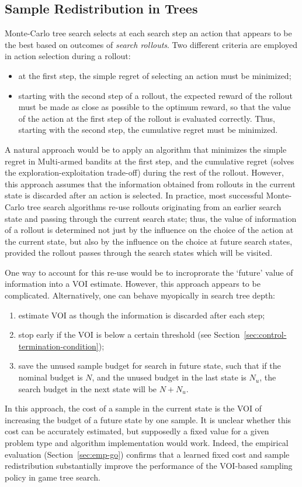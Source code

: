 \documentclass{article}
\begin{document}
\subsection{Sample Redistribution in Trees}

Monte-Carlo tree search \cite{Chaslot.montecarlo} selects at each
search step an action that appears to be the best based on outcomes
of \textit{search rollouts}. Two different criteria are employed in
action selection during a rollout:
\begin{itemize}
\item at the first step, the simple regret of selecting an action
must be minimized;
\item starting with the second step of a rollout, the expected reward
of the rollout
 must be made as close as possible to the optimum reward, so that the
 value of the action at the first step of the rollout is evaluated
 correctly. Thus, starting with the second step, the cumulative regret
 must be minimized.
\end{itemize}

A natural approach would be to apply an algorithm that minimizes the
simple regret in Multi-armed bandits at the first step, and the
cumulative regret (solves the exploration-exploitation trade-off)
during the rest of the rollout.  However, this approach assumes that
the information obtained from rollouts in the current state is
discarded after an action is selected. In practice, most successful
Monte-Carlo tree search algorithms re-use rollouts originating from an
earlier search state and passing through the current search state;
thus, the value of information of a rollout is determined not just by
the influence on the choice of the action at the current state, but
also by the influence on the choice at future search states, provided
the rollout passes through the search states which will be visited.

One way to account for this re-use would be to incroprorate the
`future' value of information into a VOI estimate. However, this 
approach appears to be complicated. Alternatively, one can behave
myopically in search tree depth:
\begin{enumerate}
\item estimate VOI as though the information is discarded after each step;
\item stop early if the VOI is below a certain threshold
   (see Section~\ref{sec:control-termination-condition});
\item save the unused sample budget for search in future state, such that
   if the nominal budget is $N$, and the unused budget in the last state
   is $N_u$, the search budget in the next state will be $N+N_u$.
\end{enumerate}
In this approach, the cost of a sample in the current state is the
VOI of increasing the budget of a future state by one sample.  It is
unclear whether this cost can be accurately estimated, but supposedly a
fixed value for a given problem type and algorithm implementation would
work. Indeed, the empirical evaluation (Section~\ref{sec:emp-go})
confirms that a learned fixed cost and sample redistribution
substantially improve the performance of the VOI-based sampling policy
in game tree search.
\end{document}
